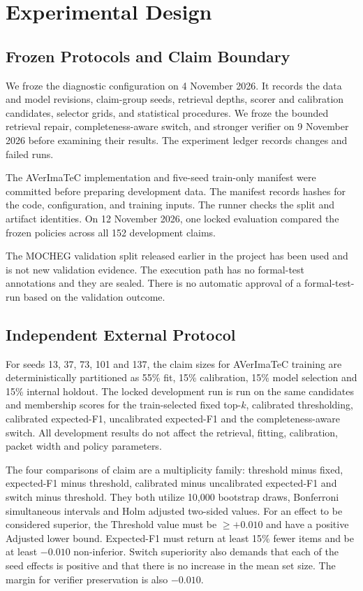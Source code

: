 \section{Experimental Design}
\label{sec:setup}

\subsection{Frozen Protocols and Claim Boundary}

We froze the diagnostic configuration on 4 November 2026. It records the data and model revisions, claim-group seeds, retrieval depths, scorer and calibration candidates, selector grids, and statistical procedures. We froze the bounded retrieval repair, completeness-aware switch, and stronger verifier on 9 November 2026 before examining their results. The experiment ledger records changes and failed runs.

The AVerImaTeC implementation and five-seed train-only manifest were committed before preparing development data. The manifest records hashes for the code, configuration, and training inputs. The runner checks the split and artifact identities. On 12 November 2026, one locked evaluation compared the frozen policies across all 152 development claims.

The MOCHEG validation split released earlier in the project has been used and is not new validation evidence. The execution path has no formal-test annotations and they are sealed. There is no automatic approval of a formal-test-run based on the validation outcome.

\subsection{Independent External Protocol}

For seeds 13, 37, 73, 101 and 137, the claim sizes for AVerImaTeC training are deterministically partitioned as 55\% fit, 15\% calibration, 15\% model selection and 15\% internal holdout. The locked development run is run on the same candidates and membership scores for the train-selected fixed top-$k$, calibrated thresholding, calibrated expected-F1, uncalibrated expected-F1 and the completeness-aware switch. All development results do not affect the retrieval, fitting, calibration, packet width and policy parameters.

The four comparisons of claim are a multiplicity family: threshold minus fixed, expected-F1 minus threshold, calibrated minus uncalibrated expected-F1 and switch minus threshold. They both utilize 10,000 bootstrap draws, Bonferroni simultaneous intervals and Holm adjusted two-sided values. For an effect to be considered superior, the Threshold value must be $\geq +0.010$ and have a positive Adjusted lower bound. Expected-F1 must return at least 15\% fewer items and be at least $-0.010$ non-inferior. Switch superiority also demands that each of the seed effects is positive and that there is no increase in the mean set size. The margin for verifier preservation is also $-0.010$.

